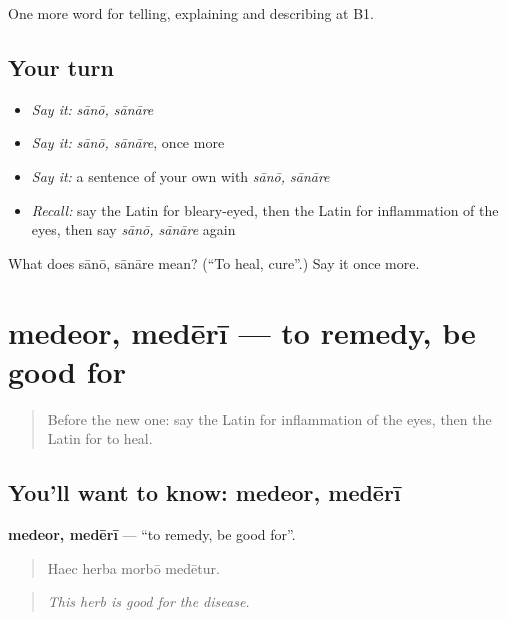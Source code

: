 \begin{grammarlens}[title={What you've built}]
One more word for telling, explaining and describing at B1.
\end{grammarlens}

\subsection*{Your turn}
\begin{itemize}
\raggedright
  \item \emph{Say it:} \emph{sānō, sānāre}
  \item \emph{Say it:} \emph{sānō, sānāre}, once more
  \item \emph{Say it:} a sentence of your own with \emph{sānō, sānāre}
  \item \emph{Recall:} say the Latin for bleary-eyed, then the Latin for inflammation of the eyes, then say \emph{sānō, sānāre} again
\end{itemize}

\begin{tcolorbox}[breakable,colback=teal!4,colframe=teal!35!black,title={Before you move on}]
What does sānō, sānāre mean? (\textquotedblleft{}To heal, cure\textquotedblright{}.) Say it once more.
\end{tcolorbox}
\section[medeor, medērī]{medeor, medērī — to remedy, be good for}

\label{lesson:LA-C526-medeor}



\begin{quote}
Before the new one: say the Latin for inflammation of the eyes, then the Latin for to heal.
\end{quote}

\subsection*{You'll want to know: medeor, medērī}
\textbf{medeor, medērī} — \textquotedblleft{}to remedy, be good for\textquotedblright{}.

\begin{quote}
Haec herba morbō medētur.
\end{quote}

\begin{quote}
\emph{This herb is good for the disease.}
\end{quote}

